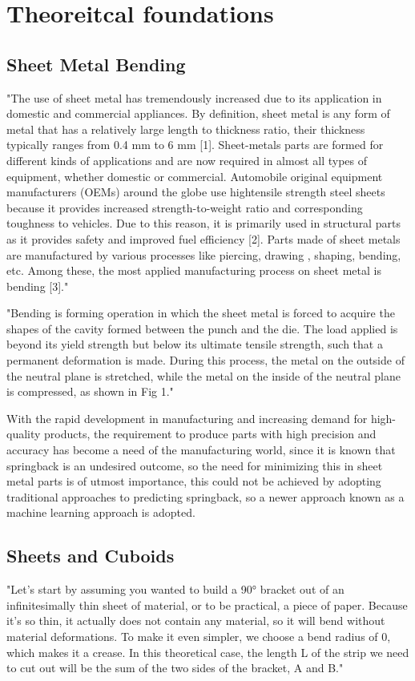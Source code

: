 \chapter{Theoreitcal foundations}

\section{Sheet Metal Bending}
"The use of sheet metal has tremendously increased due to its application in domestic and commercial appliances. By definition, sheet metal is any form of metal that has a relatively large length to thickness ratio, their thickness typically ranges from 0.4 mm to 6 mm [1]. Sheet-metals parts are formed for different kinds of applications and are now required in almost all types of equipment, whether domestic or commercial. Automobile original equipment manufacturers (OEMs) around the globe use hightensile strength steel sheets because it provides increased strength-to-weight ratio and corresponding toughness to vehicles. Due to this reason, it is primarily used in structural parts as it provides safety and improved fuel efficiency [2]. Parts made of sheet metals are manufactured by various processes like piercing, drawing , shaping, bending, etc. Among these, the most applied manufacturing process on sheet metal is bending [3]." 
\cite{baig_machinelearningprediction_2021} 

"Bending is forming operation in which the sheet metal is forced to acquire the shapes of the cavity formed between the punch and the die. The load applied is beyond its yield strength but below its ultimate tensile strength, such that a permanent deformation is made. During this process, the metal on
the outside of the neutral plane is stretched, while the metal on the inside of the neutral plane is compressed, as shown in Fig 1." 
\cite{baig_machinelearningprediction_2021} 

With the rapid development in manufacturing and increasing demand for high-quality products, the requirement to produce parts with high precision and accuracy has become a need of the manufacturing world, since it is known that springback is an undesired outcome, so the need for minimizing this in sheet metal parts is of utmost importance, this could not be achieved by adopting traditional approaches to predicting springback, so a newer approach known as a machine learning approach is adopted. 
\cite{baig_machinelearningprediction_2021} 

\section{Sheets and Cuboids}
"Let’s start by assuming you wanted to build a 90° bracket out of an infinitesimally thin sheet of material, or to be practical, a piece of paper. Because it’s so thin, it actually does not contain any material, so it will bend without material deformations. To make it even simpler, we choose a bend radius of 0, which makes it a crease. In this theoretical case, the length L of the strip we need to cut out will be the sum of the two sides of the bracket, A and B."
\cite{by_artsciencebending_2016a} 

